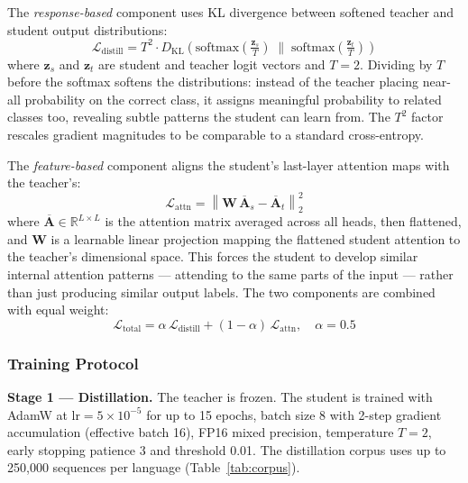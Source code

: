 \documentclass[conference]{IEEEtran}
\begin{document}
The \emph{response-based} component uses KL divergence between softened
teacher and student output distributions:
\begin{equation}
    \mathcal{L}_{\text{distill}} = T^2 \cdot D_{\text{KL}}\!\left(
      \mathrm{softmax}\!\left(\tfrac{\mathbf{z}_s}{T}\right)
      \;\Big\|\;
      \mathrm{softmax}\!\left(\tfrac{\mathbf{z}_t}{T}\right)
    \right)
    \label{eq:kl}
\end{equation}
where $\mathbf{z}_s$ and $\mathbf{z}_t$ are student and teacher logit
vectors and $T = 2$. Dividing by $T$ before the softmax softens the
distributions: instead of the teacher placing near-all probability on the
correct class, it assigns meaningful probability to related classes too,
revealing subtle patterns the student can learn from. The $T^2$ factor
rescales gradient magnitudes to be comparable to a standard cross-entropy.

The \emph{feature-based} component aligns the student's last-layer
attention maps with the teacher's:
\begin{equation}
    \mathcal{L}_{\text{attn}} =
    \left\| \mathbf{W}\,\overline{\mathbf{A}}_s
           - \overline{\mathbf{A}}_t \right\|_2^2
    \label{eq:attn}
\end{equation}
where $\overline{\mathbf{A}} \in \mathbb{R}^{L \times L}$ is the
attention matrix averaged across all heads, then flattened, and
$\mathbf{W}$ is a learnable linear projection mapping the flattened
student attention to the teacher's dimensional space. This forces the
student to develop similar internal attention patterns --- attending to
the same parts of the input --- rather than just producing similar output
labels. The two components are combined with equal weight:
\begin{equation}
    \mathcal{L}_{\text{total}} =
    \alpha\,\mathcal{L}_{\text{distill}}
    + (1 - \alpha)\,\mathcal{L}_{\text{attn}},
    \quad \alpha = 0.5
    \label{eq:total}
\end{equation}

\subsubsection{Training Protocol}
\textbf{Stage 1 --- Distillation.} The teacher is frozen. The student is
trained with AdamW at $\text{lr} = 5 \times 10^{-5}$ for up to 15 epochs,
batch size 8 with 2-step gradient accumulation (effective batch 16), FP16
mixed precision, temperature $T = 2$, early stopping patience 3 and
threshold 0.01. The distillation corpus uses up to 250,000 sequences per
language (Table~\ref{tab:corpus}).
\end{document}
